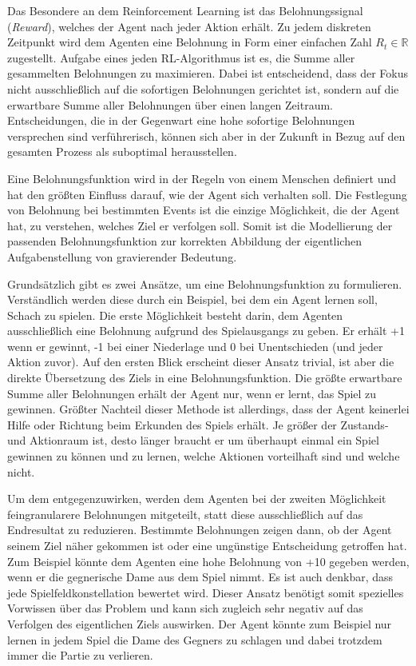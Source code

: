 Das Besondere an dem Reinforcement Learning ist das Belohnungssignal (\textit{Reward}), welches der Agent nach jeder Aktion erhält. Zu jedem diskreten Zeitpunkt wird dem Agenten eine Belohnung in Form einer einfachen Zahl $R_t \in \mathbb{R}$ zugestellt. Aufgabe eines jeden RL-Algorithmus ist es, die Summe aller gesammelten Belohnungen zu maximieren. Dabei ist entscheidend, dass der Fokus nicht ausschließlich auf die sofortigen Belohnungen gerichtet ist, sondern auf die erwartbare Summe aller Belohnungen über einen langen Zeitraum. Entscheidungen, die in der Gegenwart eine hohe sofortige Belohnungen versprechen sind verführerisch, können sich aber in der Zukunft in Bezug auf den gesamten Prozess als suboptimal herausstellen. 
\par 
Eine Belohnungsfunktion wird in der Regeln von einem Menschen definiert und hat den größten Einfluss darauf, wie der Agent sich verhalten soll. Die Festlegung von Belohnung bei bestimmten Events ist die einzige Möglichkeit, die der Agent hat, zu verstehen, welches Ziel er verfolgen soll. Somit ist die Modellierung der passenden Belohnungsfunktion zur korrekten Abbildung der eigentlichen Aufgabenstellung von gravierender Bedeutung.
\par 
Grundsätzlich gibt es zwei Ansätze, um eine Belohnungsfunktion zu formulieren. Verständlich werden diese durch ein Beispiel, bei dem ein Agent lernen soll, Schach zu spielen. Die erste Möglichkeit besteht darin, dem Agenten ausschließlich eine Belohnung aufgrund des Spielausgangs zu geben. Er erhält +1 wenn er gewinnt, -1 bei einer Niederlage und 0 bei Unentschieden (und jeder Aktion zuvor). Auf den ersten Blick erscheint dieser Ansatz trivial, ist aber die direkte Übersetzung des Ziels in eine Belohnungsfunktion. Die größte erwartbare Summe aller Belohnungen erhält der Agent nur, wenn er lernt, das Spiel zu gewinnen. Größter Nachteil dieser Methode ist allerdings, dass der Agent keinerlei Hilfe oder Richtung beim Erkunden des Spiels erhält. Je größer der Zustands- und Aktionraum ist, desto länger braucht er um überhaupt einmal ein Spiel gewinnen zu können und zu lernen, welche Aktionen vorteilhaft sind und welche nicht.
\par 
Um dem entgegenzuwirken, werden dem Agenten bei der zweiten Möglichkeit feingranularere Belohnungen mitgeteilt, statt diese ausschließlich auf das Endresultat zu reduzieren. Bestimmte Belohnungen zeigen dann, ob der Agent seinem Ziel näher gekommen ist oder eine ungünstige Entscheidung getroffen hat. Zum Beispiel könnte dem Agenten eine hohe Belohnung von +10 gegeben werden, wenn er die gegnerische Dame aus dem Spiel nimmt. Es ist auch denkbar, dass jede Spielfeldkonstellation bewertet wird. Dieser Ansatz benötigt somit spezielles Vorwissen über das Problem und kann sich zugleich sehr negativ auf das Verfolgen des eigentlichen Ziels auswirken. Der Agent könnte zum Beispiel nur lernen in jedem Spiel die Dame des Gegners zu schlagen und dabei trotzdem immer die Partie zu verlieren.
